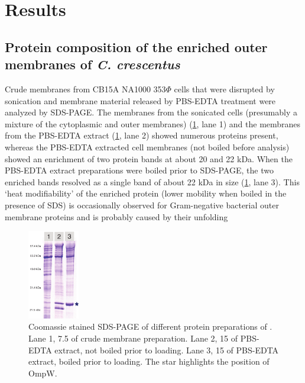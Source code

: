 \section{Results}

\subsection{Protein composition of the enriched outer membranes of \textit{C. crescentus}}
Crude membranes from \caulobacter CB15A NA1000 353$\Phi$ cells that were disrupted by sonication and membrane material released by \ac{PBS}-\ac{EDTA} treatment were analyzed by \ac{SDS-PAGE}. The membranes from the sonicated cells (presumably a mixture of the cytoplasmic and outer membranes) (\cref{fig:porin-pbsedtagel}, lane 1) and the membranes from the \ac{PBS}-\ac{EDTA} extract (\cref{fig:porin-pbsedtagel}, lane 2) showed numerous proteins present, whereas the \ac{PBS}-\ac{EDTA} extracted cell membranes (not boiled before analysis) showed an enrichment of two protein bands at about 20 and 22 kDa. When the \ac{PBS}-\ac{EDTA} extract preparations were boiled prior to \ac{SDS-PAGE}, the two enriched bands resolved as a single band of about 22 kDa in size (\cref{fig:porin-pbsedtagel}, lane 3). This `heat modifiability' of the enriched protein (\ie lower mobility when boiled in the presence of \textsc{SDS}) is occasionally observed for Gram-negative bacterial outer membrane proteins and is probably caused by their unfolding

\begin{figure}[H]
  	\begin{center}
   		\includegraphics[width=0.2\textwidth]{porin_chapter/img/Fig1-pbsedta.pdf}
   	\end{center}
   	\caption[Coomassie stained \ac{SDS-PAGE} of different protein preparations of \caulobacter.]{
	   	Coomassie stained \ac{SDS-PAGE} of different protein preparations of \caulobacter. 
Lane 1, 7.5 \microlitre of crude membrane preparation. Lane 2, 15 \microlitre of \ac{PBS}-\ac{EDTA} extract, not boiled prior to loading. Lane 3, 15 \microlitre of \ac{PBS}-\ac{EDTA} extract, boiled prior to loading. The star highlights the position of OmpW.
 	}
   	\label{fig:porin-pbsedtagel}
\end{figure}   


